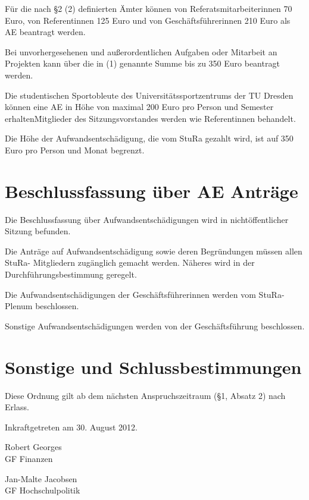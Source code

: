 \begin{multicols}{2}
\Abs \Satz Für die nach §2 (2) definierten Ämter können von Referatsmitarbeiterinnen 70 Euro, von Referentinnen 125 Euro und von Geschäftsführerinnen 210 Euro als AE beantragt werden.

\Abs \Satz Bei unvorhergesehenen und außerordentlichen Aufgaben oder Mitarbeit an Projekten kann über die in (1) genannte Summe bis zu 350 Euro beantragt werden.

\Abs \Satz  Die studentischen Sportobleute des Universitätssportzentrums der TU Dresden können eine AE in Höhe von maximal 200 Euro pro Person und Semester erhalten\. Mitglieder des Sitzungsvorstandes werden wie Referentinnen behandelt.

\Abs \Satz Die Höhe der Aufwandsentschädigung, die vom StuRa gezahlt wird, ist auf 350 Euro pro Person und Monat begrenzt. 

\section{Beschlussfassung über AE Anträge}

\Abs \Satz Die Beschlussfassung über Aufwandsentschädigungen wird in nichtöffentlicher Sitzung befunden.

\Abs \Satz Die Anträge auf Aufwandsentschädigung sowie deren Begründungen müssen allen StuRa- Mitgliedern zugänglich gemacht werden. Näheres wird in der Durchführungsbestimmung geregelt.

\Abs \Satz Die Aufwandsentschädigungen der Geschäftsführerinnen werden vom StuRa-Plenum beschlossen.

\Abs \Satz Sonstige Aufwandsentschädigungen werden von der Geschäftsführung beschlossen.


\section{Sonstige und Schlussbestimmungen}

\Abs \Satz Diese Ordnung gilt ab dem nächsten Anspruchszeitraum (§1, Absatz 2) nach Erlass.

\end{multicols}

\nopagebreak
\vspace{1cm}

\footnotesize
Inkraftgetreten am 30. August 2012.\\


\normalsize
\begin{center}
\hspace*{\fill}
\parbox{7cm}{Robert Georges\\GF Finanzen}
\hfill\parbox{7cm}{Jan-Malte Jacobsen \\GF Hochschulpolitik}
\hspace*{\fill}
\end{center}
